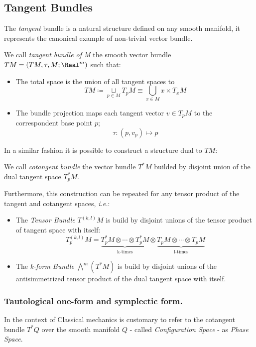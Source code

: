 \documentclass[Main]{subfiles}
\begin{document}
		\subsection{Tangent Bundles}
			The \emph{tangent} bundle is a natural structure defined on any smooth manifold, it represents the canonical example of  non-trivial vector bundle.
						
			\begin{definition}
				We call \emph{tangent bundle of M} the smooth vector bundle $TM=(TM,\tau,M;\Real^m)$ such that:
				\begin{itemize}
					\item The total space is the union of all tangent spaces to 
						$$TM \coloneqq \underset{p \in M}{\sqcup} T_pM  \equiv \bigcup_{x\in M} {x}\times T_x M$$
					\item The bundle projection maps each tangent vector $v\in  T_pM$ to the correspondent base point  $p$;
						$$\tau : (p,v_p) \mapsto p $$
				\end{itemize}
			\end{definition}			
			In a similar fashion it is possible to construct a structure dual to $TM$:
			\begin{definition}
				We call \emph{cotangent bundle} the vector bundle $T^*M$ builded by disjoint union of the dual tangent space $T_p^*M $.
			\end{definition}
			Furthermore, this construction can be repeated for any tensor product of the tangent and cotangent spaces, \textit{i.e.}:
				\begin{itemize}
					\item The \emph{Tensor Bundle} $T^{(k,l)}M$ is build by disjoint unions of the tensor product of tangent space with itself:
					\begin{displaymath}
						T^{(k,l)}_ p M = \underbrace{T^*_pM \otimes \cdots \otimes T^*_pM}_{\textrm{k-times}} \otimes
						\underbrace{T_pM \otimes \cdots \otimes T_pM}_{\textrm{l-times}}
					\end{displaymath}
					\item The \emph{k-form Bundle} $ \bigwedge^m( T^*M)$ is build by disjoint unions of the antisimmetrized tensor product of the dual tangent space with itself.
				\end{itemize}
			
			
			\subsubsection{Tautological one-form and symplectic form.}
					\begin{remark}
						In the context of Classical mechanics is customary to refer to the cotangent bundle $T^*Q$ over the smooth manifold  $Q $ - called \emph{Configuration Space}  - as \emph{Phase Space}.
					\end{remark}
\end{document}
